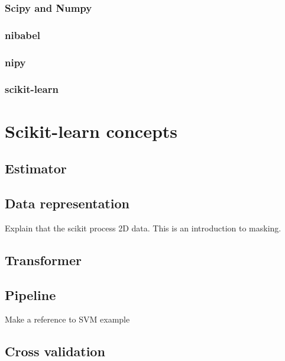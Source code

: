\documentclass{frontiersSCNS} %
\begin{document}
\subsubsection{Scipy and Numpy}
\subsubsection{nibabel}
\subsubsection{nipy}
\subsubsection{scikit-learn}




\section{Scikit-learn concepts}


\subsection{Estimator}

\subsection{Data representation}

Explain that the scikit process 2D data. This is an introduction to masking.

\subsection{Transformer}

\subsection{Pipeline}

Make a reference to SVM example

\subsection{Cross validation}
\end{document}
